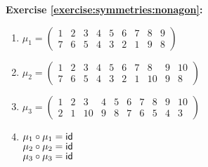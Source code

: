 \noindent\textbf{Exercise \ref{exercise:symmetries:nonagon}:}
\begin{enumerate}[{a.}]
\item 
%
$\mu_1 = \begin{pmatrix} 1 & 2 & 3 & 4 & 5 & 6 & 7 & 8 & 9 \\ 7 & 6 & 5 & 4 & 3 & 2 & 1 & 9 & 8   \end{pmatrix}$

\item
%
$\mu_2 = \begin{pmatrix} 1 & 2 & 3 & 4 & 5 & 6 & 7 & 8 & 9 & 10  \\ 7 & 6 & 5 & 4 & 3 & 2 & 1 & 10 & 9 & 8 \end{pmatrix}$

\item 
%
$\mu_3 = \begin{pmatrix} 1 & 2 & 3 & 4 & 5 & 6 & 7 & 8 & 9 & 10 \\ 2 & 1 & 10 & 9 & 8 & 7 & 6 & 5 & 4 & 3\end{pmatrix}$

\item
$\mu_1\circ\mu_1 = \sf{id}$\\
$\mu_2\circ\mu_2 = \sf{id}$\\
$\mu_3\circ\mu_3 = \sf{id}$
\end{enumerate}



